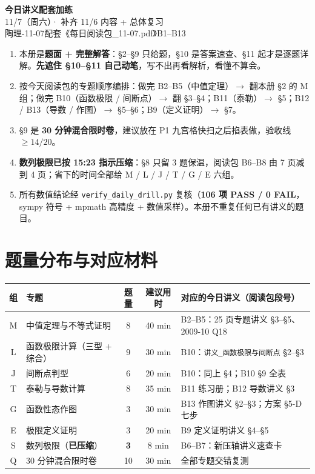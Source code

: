 \documentclass[11pt,a4paper]{ctexart}
\begin{document}
\begin{center}
  {\LARGE\bfseries 今日讲义配套加练}\\[4pt]
  {\large 11/7（周六）· 补齐 11/6 内容 + 总体复习}\\[4pt]
  {\small 陶理-11-07\quad 配套《每日阅读包\_11-07.pdf》B1--B13}
\end{center}

\begin{keypoint}
\begin{enumerate}
\item 本册是\textbf{题面 + 完整解答}：\S 2--\S 9 只给题，\S 10 是答案速查、\S 11 起才是逐题详解。\textbf{先遮住 \S 10--\S 11 自己动笔}，写不出再看解析，看懂不算会。
\item 按今天阅读包的专题顺序编排：做完 B2--B5（中值定理）$\to$ 翻本册 \S 2 的 M 组；做完 B10（函数极限 / 间断点）$\to$ 翻 \S 3--\S 4；B11（泰勒）$\to$ \S 5；B12 / B13（导数 / 作图）$\to$ \S 5--\S 6；B9（定义证明）$\to$ \S 7。
\item \S 9 是 \textbf{30 分钟混合限时卷}，建议放在 P1 九宫格快扫之后掐表做，验收线 $\geq 14/20$。
\item \textbf{数列极限已按 15:23 指示压缩}：\S 8 只留 3 题保温，阅读包 B6--B8 由 7 页减到 4 页；省下的时间全部给 M / L / J / T / G / E 六组。
\item 所有数值结论经 \texttt{verify\_daily\_drill.py} 复核（\textbf{106 项 PASS / 0 FAIL}，sympy 符号 + mpmath 高精度 + 数值采样）。本册不重复任何已有讲义的题目。
\end{enumerate}
\end{keypoint}

\section{题量分布与对应材料}

\begin{center}
\small\setlength{\tabcolsep}{5pt}
\begin{tabularx}{\linewidth}{c|l|c|c|l}
\toprule
组 & 专题 & 题量 & 建议用时 & 对应的今日讲义（阅读包段号） \\
\midrule
M & 中值定理与不等式证明 & 8 & 40 min & B2--B5：25 页专题讲义 \S 3--\S 5、2009-10 Q18 \\
L & 函数极限计算（三型 + 综合） & 9 & 30 min & B10：\texttt{讲义\_函数极限与间断点} \S 2--\S 3 \\
J & 间断点判型 & 6 & 20 min & B10：同上 \S 4；B10 \S 9 全表 \\
T & 泰勒与导数计算 & 8 & 35 min & B11 练习册；B12 导数讲义 \S 3 \\
G & 函数性态作图 & 3 & 30 min & B13 作图讲义 \S 2--\S 3；方案 \S 5-D 七步 \\
E & 极限定义证明 & 3 & 20 min & B9 定义证明讲义 \S 4--\S 5 \\
S & 数列极限（\textbf{已压缩}） & \textbf{3} & 8 min & B6--B7：新压轴讲义速查卡 \\
Q & 30 分钟混合限时卷 & 10 & 30 min & 全部专题交错复测 \\
\bottomrule
\end{tabularx}
\end{center}
\end{document}
